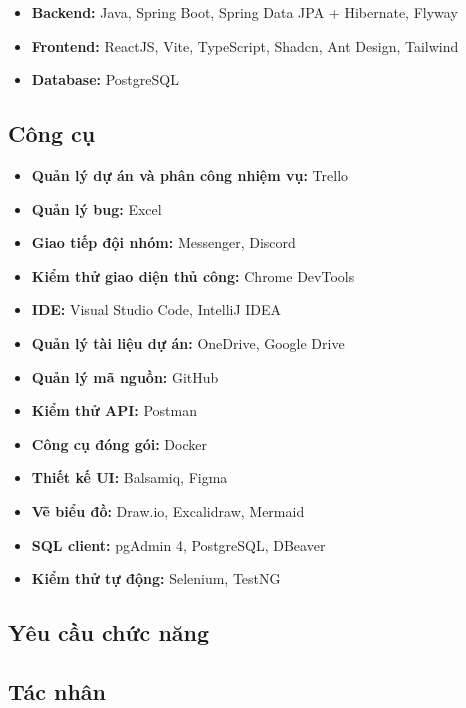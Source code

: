 \documentclass[12pt,a4paper]{article}
\begin{document}
\begin{itemize}
  \item \textbf{Backend:} Java, Spring Boot, Spring Data JPA + Hibernate, Flyway
  \item \textbf{Frontend:} ReactJS, Vite, TypeScript, Shadcn, Ant Design, Tailwind
  \item \textbf{Database:} PostgreSQL
\end{itemize}

\subsection{Công cụ}

\begin{itemize}
  \item \textbf{Quản lý dự án và phân công nhiệm vụ:} Trello
  \item \textbf{Quản lý bug:} Excel
  \item \textbf{Giao tiếp đội nhóm:} Messenger, Discord
  \item \textbf{Kiểm thử giao diện thủ công:} Chrome DevTools
  \item \textbf{IDE:} Visual Studio Code, IntelliJ IDEA
  \item \textbf{Quản lý tài liệu dự án:} OneDrive, Google Drive
  \item \textbf{Quản lý mã nguồn:} GitHub
  \item \textbf{Kiểm thử API:} Postman
  \item \textbf{Công cụ đóng gói:} Docker
  \item \textbf{Thiết kế UI:} Balsamiq, Figma
  \item \textbf{Vẽ biểu đồ:} Draw.io, Excalidraw, Mermaid
  \item \textbf{SQL client:} pgAdmin 4, PostgreSQL, DBeaver
  \item \textbf{Kiểm thử tự động:} Selenium, TestNG
\end{itemize}

\clearpage

\begin{center}
\section{Yêu cầu chức năng}
\end{center}

\subsection{Tác nhân}
\end{document}
